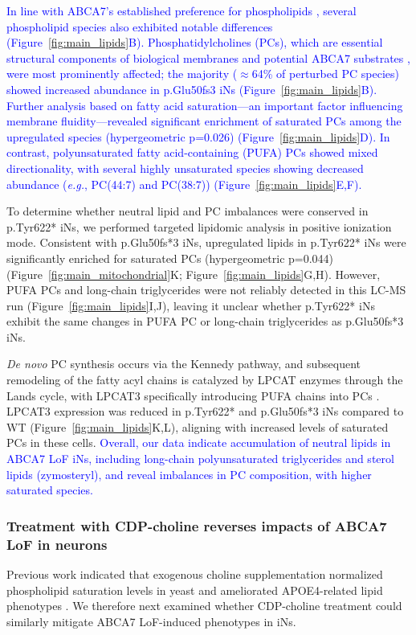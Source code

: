 \newcommand{\quoteB}{\textcolor{blue}{In line with ABCA7's established preference for phospholipids \cite{Tomioka2017-sq,Picataggi2022-hf,Fang2025}, several phospholipid species also exhibited notable differences (Figure~\ref{fig:main_lipids}B). Phosphatidylcholines (PCs), which are essential structural components of biological membranes and potential ABCA7 substrates \cite{LeThiMy2022-dp,Fang2025}, were most prominently affected; the majority ($\approx$64\% of perturbed PC species) showed increased abundance in p.Glu50fs3 iNs (Figure~\ref{fig:main_lipids}B). Further analysis based on fatty acid saturation—an important factor influencing membrane fluidity—revealed significant enrichment of saturated PCs among the upregulated species (hypergeometric p=0.026) (Figure~\ref{fig:main_lipids}D). In contrast, polyunsaturated fatty acid-containing (PUFA) PCs showed mixed directionality, with several highly unsaturated species showing decreased abundance (\textit{e.g.}, PC(44:7) and PC(38:7)) (Figure~\ref{fig:main_lipids}E,F).}}
\quoteB

To determine whether neutral lipid and PC imbalances were conserved in p.Tyr622* iNs, we performed targeted lipidomic analysis in positive ionization mode. Consistent with p.Glu50fs*3 iNs, upregulated lipids in p.Tyr622* iNs were significantly enriched for saturated PCs (hypergeometric p=0.044) (Figure~\ref{fig:main_mitochondrial}K; Figure~\ref{fig:main_lipids}G,H). However, PUFA PCs and long-chain triglycerides were not reliably detected in this LC-MS run (Figure~\ref{fig:main_lipids}I,J), leaving it unclear whether p.Tyr622* iNs exhibit the same changes in PUFA PC or long-chain triglycerides as p.Glu50fs*3 iNs.

\textit{De novo} PC synthesis occurs via the Kennedy pathway, and subsequent remodeling of the fatty acyl chains is catalyzed by LPCAT enzymes through the Lands cycle, with LPCAT3 specifically introducing PUFA chains into PCs \cite{Boumann2003-ew,Wang2019-om,Zhao2008-pq}. LPCAT3 expression was reduced in p.Tyr622* and p.Glu50fs*3 iNs compared to WT (Figure~\ref{fig:main_lipids}K,L), aligning with increased levels of saturated PCs in these cells. \newcommand{\quoteH}{\textcolor{blue}{Overall, our data indicate accumulation of neutral lipids in ABCA7 LoF iNs, including long-chain polyunsaturated triglycerides and sterol lipids (zymosteryl), and reveal imbalances in PC composition, with higher saturated species.\label{quoteH-label}}}
\quoteH

\subsubsection{Treatment with CDP-choline reverses impacts of ABCA7 LoF in neurons}
Previous work indicated that exogenous choline supplementation normalized phospholipid saturation levels in yeast and ameliorated APOE4-related lipid phenotypes \cite{Boumann2006-nz,Sienski2021-zt}. We therefore next examined whether CDP-choline treatment could similarly mitigate ABCA7 LoF-induced phenotypes in iNs.

